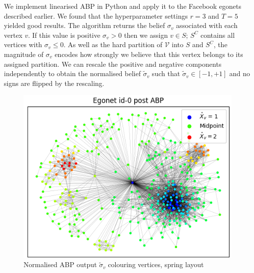 \documentclass[11pt]{article}
\newcommand{\Vcal}{\mathcal{V}}
\newcommand{\figwidth}{0.8\linewidth}
\begin{document}
\begin{multicols*}{2}
We implement linearised ABP in Python and apply it to the Facebook egonets described earlier. We found that the hyperparameter settings $r=3$ and $T=5$ yielded good results. The algorithm returns the belief $\sigma_v$ associated with each vertex $v$. If this value is positive $\sigma_v > 0$ then we assign $v \in S$; $S^C$ contains all vertices with $\sigma_v \leq 0$. As well as the hard partition of $\Vcal$ into $S$ and $S^C$, the magnitude of $\sigma_v$ encodes how strongly we believe that this vertex belongs to its assigned partition. We can rescale the positive and negative components independently to obtain the normalised belief $\tilde{\sigma}_v$ such that $\tilde{\sigma}_v \in [-1, +1]$ and no signs are flipped by the rescaling.
%
\begin{figure}[H]
	\centering
	\includegraphics[width=\figwidth]{ego-0-abp.png}
	\caption{Normalised ABP output $\tilde{\sigma}_v$ colouring vertices, spring layout}
	\label{fig:abp-output-norm}
\end{figure}


\end{multicols*}
\end{document}

